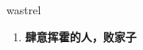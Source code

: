 
\begin{frame}
{\huge wastrel}
\begin{center}
\begin{enumerate}\Large
  \item \textbf{肆意挥霍的人，败家子}
\end{enumerate}
\end{center}
\end{frame}
